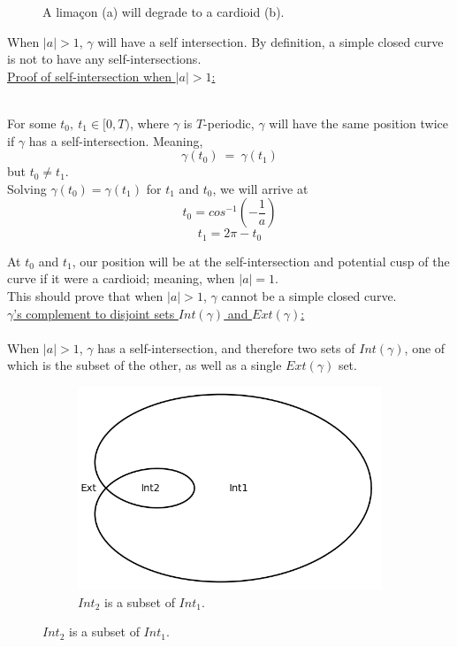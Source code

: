 \documentclass[12pt]{article}
\begin{document}
\begin{figure}[h!]
  \caption*{A limaçon (a) will degrade to a cardioid (b).}
\end{figure}
\clearpage
When $|a|>1$, $\gamma$ will have a self intersection. By definition, a simple closed curve is not to have any self-intersections.\\

\noindent
\underline{Proof of self-intersection when $|a|>1$:}\\\\
\indent

For some $t_0, \ t_1 \in [0,T)$, where $\gamma$ is $T$-periodic, $\gamma$ will have the same position twice if $\gamma$ has a self-intersection. Meaning,
$$
\gamma(t_0) \ = \ \gamma(t_1)
$$
but $t_0 \neq t_1$.\\

Solving $\gamma(t_0) = \gamma(t_1)$  for $t_1$ and $t_0$, we will arrive at
$$
t_0 = cos^{-1}\left(-\frac{1}{a}\right)
$$
$$
t_1 = 2\pi - t_0
$$

At $t_0$ and $t_1$, our position will be at the self-intersection and potential cusp of the curve if it were a cardioid; meaning, when $|a| = 1$.\\
This should prove that when $|a|>1$, $\gamma$ cannot be a simple closed curve.\\

\noindent
\underline{$\gamma$'s complement to disjoint sets $Int(\gamma)$ and $Ext(\gamma)$:}\\\\
\indent
When $|a|>1$, $\gamma$ has a self-intersection, and therefore two sets of $Int(\gamma)$, one of which is the subset of the other, as well as a single $Ext(\gamma)$ set.

\begin{figure}[h!]
  \centering
      \begin{subfigure}[b]{0.6\linewidth}
    \includegraphics[width=\linewidth]{./assets/3-1-1/limacon-int-ext.png}
    \caption*{$Int_2$ is a subset of $Int_1$.}
  \end{subfigure}
  \end{figure}
  
\end{document}
